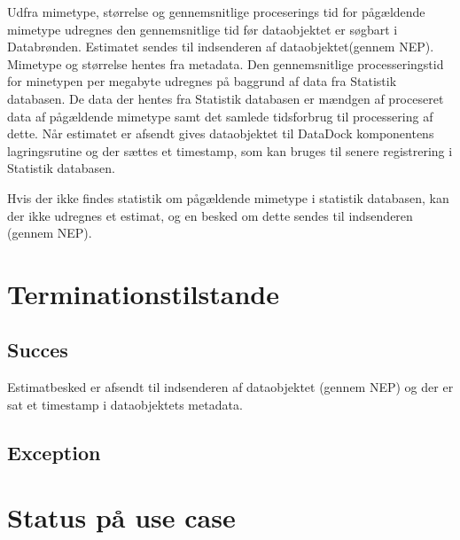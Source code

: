 \documentclass{article}
\begin{document}
Udfra mimetype, størrelse og gennemsnitlige proceserings tid
for pågældende mimetype udregnes den gennemsnitlige tid før
dataobjektet er søgbart i Databrønden. Estimatet sendes til
indsenderen af dataobjektet(gennem NEP).
Mimetype og størrelse hentes fra metadata. Den gennemsnitlige
processeringstid for minetypen per megabyte udregnes på baggrund
af data fra Statistik databasen. De data der hentes fra Statistik
databasen er mændgen af proceseret data af pågældende mimetype samt det
samlede tidsforbrug til processering af dette.
Når estimatet er afsendt gives dataobjektet til DataDock komponentens
lagringsrutine og der sættes et timestamp, som kan bruges til senere
registrering i Statistik databasen.

Hvis der ikke findes statistik om pågældende mimetype i statistik
databasen, kan der ikke udregnes et estimat, og en besked om dette
sendes til indsenderen (gennem NEP).

\section{Terminationstilstande}

\subsection{Succes}
Estimatbesked er afsendt til indsenderen af dataobjektet (gennem NEP)
og der er sat et timestamp i dataobjektets metadata.

\subsection{Exception}


\section{Status på use case}
\end{document}
